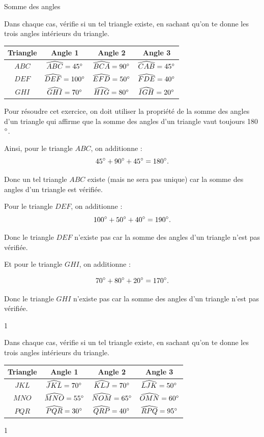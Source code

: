 \documentclass[a4paper,11pt]{report}
\begin{document}
\begin{resolu}{Somme des angles}{Dans chaque cas, vérifie si un tel triangle existe, en sachant qu'on te donne les trois angles intérieurs du triangle.
\begin{center}
\begin{tabular}{|c|c|c|c|}\hline
{\bf Triangle} & {\bf Angle 1} & {\bf Angle 2} & {\bf Angle 3} \\\hline
$ABC$ & $\widehat{ABC}=45^\circ$ & $\widehat{BCA}=90^\circ$ & $\widehat{CAB}=45^\circ$ \\\hline
$DEF$ & $\widehat{DEF}=100^\circ$ & $\widehat{EFD}=50^\circ$ & $\widehat{FDE}=40^\circ$ \\\hline
$GHI$ & $\widehat{GHI}=70^\circ$ & $\widehat{HIG}=80^\circ$ & $\widehat{IGH}=20^\circ$ \\\hline
\end{tabular}
\end{center}
{\color{blue} Pour résoudre cet exercice, on doit utiliser la propriété de la somme des angles d'un triangle qui affirme que la somme des angles d'un triangle vaut toujours 180 $^\circ$.

Ainsi, pour le triangle $ABC$, on additionne : \[45^\circ + 90^\circ +45^\circ = 180^\circ .\]

Donc un tel triangle $ABC$ existe (mais ne sera pas unique) car la somme des angles d'un triangle est vérifiée.

Pour le triangle $DEF$, on additionne :\[100^\circ + 50^\circ +40^\circ = 190^\circ .\]

Donc le triangle $DEF$ n'existe pas car la somme des angles d'un triangle n'est pas vérifiée.

Et pour le triangle $GHI$, on additionne :

\[ 70^\circ + 80^\circ +20^\circ = 170^\circ .\]

Donc le triangle $GHI$ n'existe pas car la somme des angles d'un triangle n'est pas vérifiée.
}
}{1}
\end{resolu}

\begin{exo}
{Dans chaque cas, vérifie si un tel triangle existe, en sachant qu'on te donne les trois angles intérieurs du triangle.
\begin{center}
\begin{tabular}{|c|c|c|c|}\hline
{\bf Triangle} & {\bf Angle 1} & {\bf Angle 2} & {\bf Angle 3} \\\hline
$JKL$ & $\widehat{JKL}=70^\circ$ & $\widehat{KLJ}=70^\circ$ & $\widehat{LJK}=50^\circ$ \\\hline
$MNO$ & $\widehat{MNO}=55^\circ$ & $\widehat{NOM}=65^\circ$ & $\widehat{OMN}=60^\circ$ \\\hline
$PQR$ & $\widehat{PQR}=30^\circ$ & $\widehat{QRP}=40^\circ$ & $\widehat{RPQ}=95^\circ$ \\\hline
\end{tabular}
\end{center}}{1}
\end{exo}
\end{document}
